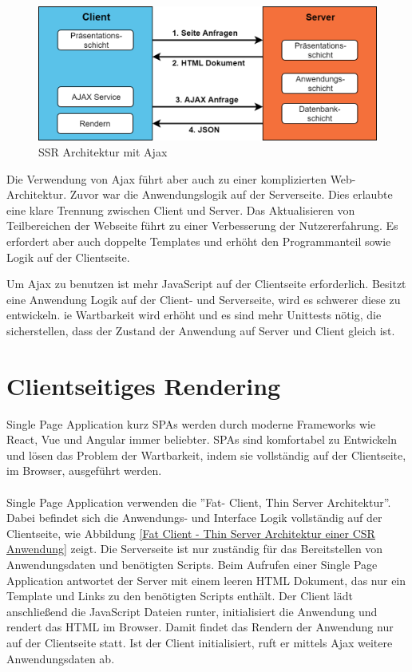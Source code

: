 \documentclass[runningheads]{llncs}
\begin{document}
\begin{figure}[h]
  \centering
  \includegraphics[width=12cm]{images/serverajax}
  \caption{SSR Architektur mit Ajax}
  \label{SSR Architektur mit Ajax}
\end{figure}
Die Verwendung von Ajax führt aber auch zu einer komplizierten Web-Architektur. 
Zuvor war die Anwendungslogik auf der Serverseite. 
Dies erlaubte eine klare Trennung zwischen Client und Server. 
Das Aktualisieren von Teilbereichen der Webseite führt 
zu einer Verbesserung der Nutzererfahrung. 
Es erfordert aber auch doppelte Templates und erhöht den Programmanteil sowie Logik auf der Clientseite.

Um Ajax zu benutzen ist mehr JavaScript auf der Clientseite erforderlich. 
Besitzt eine Anwendung Logik auf der Client- und Serverseite, 
wird es schwerer diese zu entwickeln. 
ie Wartbarkeit wird erhöht und es sind mehr Unittests nötig, 
die sicherstellen, dass der Zustand der Anwendung auf Server und 
Client gleich ist. 
\newpage

\section{Clientseitiges Rendering}
\label{sec:Clientseitiges Rendering}

Single Page Application kurz SPAs werden durch moderne Frameworks wie React, 
Vue und Angular immer beliebter. SPAs sind komfortabel zu Entwickeln 
und lösen das Problem der Wartbarkeit, 
indem sie vollständig auf der Clientseite, 
im Browser, ausgeführt werden.
\\
\\
Single Page Application verwenden die ”Fat- Client, Thin Server Architektur”. 
Dabei befindet sich die Anwendungs- und Interface Logik vollständig auf der Clientseite, wie Abbildung 
\ref{Fat Client - Thin Server Architektur einer CSR Anwendung} zeigt.
Die Serverseite ist nur zuständig für das Bereitstellen von Anwendungsdaten 
und benötigten Scripts. 
Beim Aufrufen einer Single Page Application antwortet der Server 
mit einem leeren HTML Dokument, das nur ein Template und Links 
zu den benötigten Scripts enthält. 
Der Client lädt anschließend die JavaScript Dateien runter, 
initialisiert die Anwendung und rendert das HTML im Browser. 
Damit findet das Rendern der Anwendung nur auf der Clientseite statt. 
Ist der Client initialisiert, ruft er mittels Ajax weitere Anwendungsdaten ab.
\end{document}

